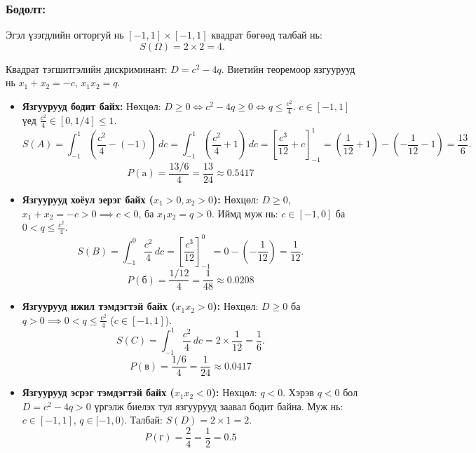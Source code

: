 \documentclass[11pt,a4paper]{article}
\begin{document}
\subsubsection*{Бодолт:}

Эгэл үзэгдлийн огторгуй нь $[-1, 1] \times [-1, 1]$ квадрат бөгөөд талбай нь:
\[
  S(\Omega) = 2 \times 2 = 4.
\]

Квадрат тэгшитгэлийн дискриминант: $D = c^2 - 4q$.
Виетийн теоремоор язгуурууд нь $x_1 + x_2 = -c$, $x_1 x_2 = q$.

\begin{itemize}[leftmargin=1.4em, itemsep=3pt]
  \item[\textbf{a)}] \textbf{Язгуурууд бодит байх:}
  Нөхцөл: $D \ge 0 \iff c^2 - 4q \ge 0 \iff q \le \frac{c^2}{4}$.
  $c \in [-1, 1]$ үед $\frac{c^2}{4} \in [0, 1/4] \le 1$.
  \[
    S(A) = \int_{-1}^1 \left(\frac{c^2}{4} - (-1)\right) \, dc = \int_{-1}^1 \left(\frac{c^2}{4} + 1\right) \, dc = \left[ \frac{c^3}{12} + c \right]_{-1}^1 = \left(\frac{1}{12} + 1\right) - \left(-\frac{1}{12} - 1\right) = \frac{13}{6}.
  \]
  \[
    P(\text{a}) = \frac{13/6}{4} = \frac{13}{24} \approx 0.5417
  \]

  \item[\textbf{б)}] \textbf{Язгуурууд хоёул эерэг байх ($x_1 > 0, x_2 > 0$):}
  Нөхцөл: $D \ge 0$, $x_1 + x_2 = -c > 0 \implies c < 0$, ба $x_1 x_2 = q > 0$.
  Иймд муж нь: $c \in [-1, 0]$ ба $0 < q \le \frac{c^2}{4}$.
  \[
    S(B) = \int_{-1}^0 \frac{c^2}{4} \, dc = \left[ \frac{c^3}{12} \right]_{-1}^0 = 0 - \left(-\frac{1}{12}\right) = \frac{1}{12}.
  \]
  \[
    P(\text{б}) = \frac{1/12}{4} = \frac{1}{48} \approx 0.0208
  \]

  \item[\textbf{в)}] \textbf{Язгуурууд ижил тэмдэгтэй байх ($x_1 x_2 > 0$):}
  Нөхцөл: $D \ge 0$ ба $q > 0 \implies 0 < q \le \frac{c^2}{4}$ ($c \in [-1, 1]$).
  \[
    S(C) = \int_{-1}^1 \frac{c^2}{4} \, dc = 2 \times \frac{1}{12} = \frac{1}{6}.
  \]
  \[
    P(\text{в}) = \frac{1/6}{4} = \frac{1}{24} \approx 0.0417
  \]

  \item[\textbf{г)}] \textbf{Язгуурууд эсрэг тэмдэгтэй байх ($x_1 x_2 < 0$):}
  Нөхцөл: $q < 0$. Хэрэв $q < 0$ бол $D = c^2 - 4q > 0$ үргэлж биелэх тул язгуурууд заавал бодит байна.
  Муж нь: $c \in [-1, 1]$, $q \in [-1, 0)$.
  Талбай: $S(D) = 2 \times 1 = 2$.
  \[
    P(\text{г}) = \frac{2}{4} = \frac{1}{2} = 0.5
  \]
\end{itemize}

\vspace{0.8em}
\end{document}
